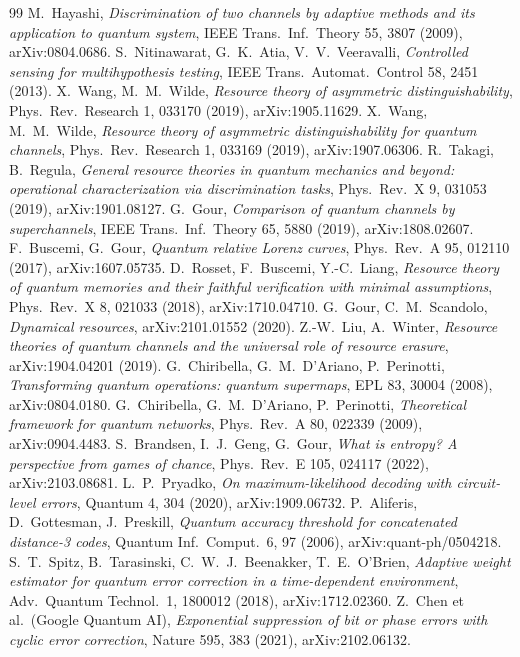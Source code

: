 \documentclass[a4paper,11pt]{article}
\theoremstyle{plain}
\theoremstyle{definition}
\theoremstyle{remark}
\begin{document}
\begin{thebibliography}{99}
 M.~Hayashi, \emph{Discrimination of two channels by adaptive methods and its application to quantum system}, IEEE Trans.\ Inf.\ Theory 55, 3807 (2009), arXiv:0804.0686.
 S.~Nitinawarat, G.~K.~Atia, V.~V.~Veeravalli, \emph{Controlled sensing for multihypothesis testing}, IEEE Trans.\ Automat.\ Control 58, 2451 (2013).
 X.~Wang, M.~M.~Wilde, \emph{Resource theory of asymmetric distinguishability}, Phys.\ Rev.\ Research 1, 033170 (2019), arXiv:1905.11629.
 X.~Wang, M.~M.~Wilde, \emph{Resource theory of asymmetric distinguishability for quantum channels}, Phys.\ Rev.\ Research 1, 033169 (2019), arXiv:1907.06306.
 R.~Takagi, B.~Regula, \emph{General resource theories in quantum mechanics and beyond: operational characterization via discrimination tasks}, Phys.\ Rev.\ X 9, 031053 (2019), arXiv:1901.08127.
 G.~Gour, \emph{Comparison of quantum channels by superchannels}, IEEE Trans.\ Inf.\ Theory 65, 5880 (2019), arXiv:1808.02607.
 F.~Buscemi, G.~Gour, \emph{Quantum relative Lorenz curves}, Phys.\ Rev.\ A 95, 012110 (2017), arXiv:1607.05735.
 D.~Rosset, F.~Buscemi, Y.-C.~Liang, \emph{Resource theory of quantum memories and their faithful verification with minimal assumptions}, Phys.\ Rev.\ X 8, 021033 (2018), arXiv:1710.04710.
 G.~Gour, C.~M.~Scandolo, \emph{Dynamical resources}, arXiv:2101.01552 (2020).
 Z.-W.~Liu, A.~Winter, \emph{Resource theories of quantum channels and the universal role of resource erasure}, arXiv:1904.04201 (2019).
 G.~Chiribella, G.~M.~D'Ariano, P.~Perinotti, \emph{Transforming quantum operations: quantum supermaps}, EPL 83, 30004 (2008), arXiv:0804.0180.
 G.~Chiribella, G.~M.~D'Ariano, P.~Perinotti, \emph{Theoretical framework for quantum networks}, Phys.\ Rev.\ A 80, 022339 (2009), arXiv:0904.4483.
 S.~Brandsen, I.~J.~Geng, G.~Gour, \emph{What is entropy? A perspective from games of chance}, Phys.\ Rev.\ E 105, 024117 (2022), arXiv:2103.08681.
 L.~P.~Pryadko, \emph{On maximum-likelihood decoding with circuit-level errors}, Quantum 4, 304 (2020), arXiv:1909.06732.
 P.~Aliferis, D.~Gottesman, J.~Preskill, \emph{Quantum accuracy threshold for concatenated distance-3 codes}, Quantum Inf.\ Comput.\ 6, 97 (2006), arXiv:quant-ph/0504218.
 S.~T.~Spitz, B.~Tarasinski, C.~W.~J.~Beenakker, T.~E.~O'Brien, \emph{Adaptive weight estimator for quantum error correction in a time-dependent environment}, Adv.\ Quantum Technol.\ 1, 1800012 (2018), arXiv:1712.02360.
 Z.~Chen et al.\ (Google Quantum AI), \emph{Exponential suppression of bit or phase errors with cyclic error correction}, Nature 595, 383 (2021), arXiv:2102.06132.
\end{thebibliography}
\end{document}
